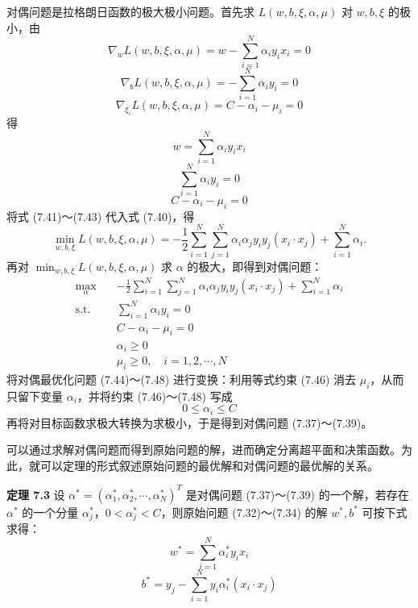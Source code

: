 \documentclass[UTF8, 12pt, fontset=fandol, oneside]{ctexart}
\begin{document}
对偶问题是拉格朗日函数的极大极小问题。首先求 $L(w,b,\xi,\alpha,\mu)$ 对 $w,b,\xi$ 的极小，由
\[
\nabla_w L(w,b,\xi,\alpha,\mu)=w-\sum_{i=1}^N\alpha_i y_i x_i=0
\]
\[
\nabla_b L(w,b,\xi,\alpha,\mu)=-\sum_{i=1}^N\alpha_i y_i=0
\]
\[
\nabla_{\xi_i} L(w,b,\xi,\alpha,\mu)=C-\alpha_i-\mu_i=0
\]
得
\begin{equation}
w=\sum_{i=1}^N\alpha_i y_i x_i
\tag{7.41}
\end{equation}
\begin{equation}
\sum_{i=1}^N\alpha_i y_i=0
\tag{7.42}
\end{equation}
\begin{equation}
C-\alpha_i-\mu_i=0
\tag{7.43}
\end{equation}
将式 (7.41)～(7.43) 代入式 (7.40)，得
\[
\min_{w,b,\xi}L(w,b,\xi,\alpha,\mu)
=-\frac{1}{2}\sum_{i=1}^N\sum_{j=1}^N\alpha_i\alpha_j y_i y_j(x_i\cdot x_j)+\sum_{i=1}^N\alpha_i.
\]
再对 $\min_{w,b,\xi}L(w,b,\xi,\alpha,\mu)$ 求 $\alpha$ 的极大，即得到对偶问题：
\begin{equation}
\begin{aligned}
\max_\alpha\quad & -\frac{1}{2}\sum_{i=1}^N\sum_{j=1}^N\alpha_i\alpha_j y_i y_j(x_i\cdot x_j)+\sum_{i=1}^N\alpha_i\\
\mathrm{s.t.}\quad & \sum_{i=1}^N\alpha_i y_i=0\\
& C-\alpha_i-\mu_i=0\\
& \alpha_i\geq 0\\
& \mu_i\geq 0,\quad i=1,2,\cdots,N
\end{aligned}
\tag{7.44--7.48}
\end{equation}
将对偶最优化问题 (7.44)～(7.48) 进行变换：利用等式约束 (7.46) 消去 $\mu_i$，从而只留下变量 $\alpha_i$，并将约束 (7.46)～(7.48) 写成
\begin{equation}
0\leq \alpha_i\leq C
\tag{7.49}
\end{equation}
再将对目标函数求极大转换为求极小，于是得到对偶问题 (7.37)～(7.39)。

可以通过求解对偶问题而得到原始问题的解，进而确定分离超平面和决策函数。为此，就可以定理的形式叙述原始问题的最优解和对偶问题的最优解的关系。

\noindent\textbf{定理 7.3}\quad
设 $\alpha^*=(\alpha_1^*,\alpha_2^*,\cdots,\alpha_N^*)^T$ 是对偶问题 (7.37)～(7.39) 的一个解，若存在 $\alpha^*$ 的一个分量 $\alpha_j^*$，$0<\alpha_j^*<C$，则原始问题 (7.32)～(7.34) 的解 $w^*,b^*$ 可按下式求得：
\begin{equation}
w^*=\sum_{i=1}^N\alpha_i^*y_i x_i
\tag{7.50}
\end{equation}
\begin{equation}
b^*=y_j-\sum_{i=1}^N y_i\alpha_i^*(x_i\cdot x_j)
\tag{7.51}
\end{equation}
\end{document}
